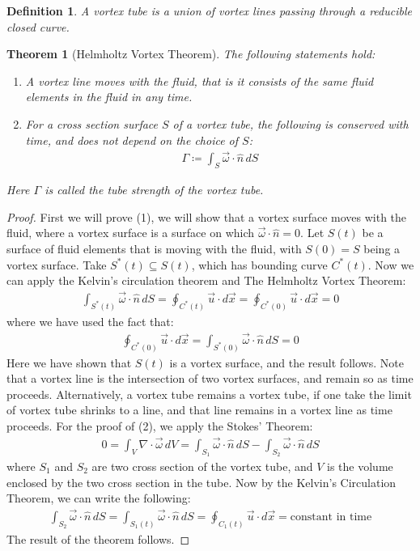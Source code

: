 \documentclass[11pt]{book}
\theoremstyle{break}
\theoremstyle{break}
\newtheorem{thm}{Theorem}[section]
\newtheorem{defn}{Definition}[corL]
\begin{document}
\begin{defn}
A vortex tube is a union of vortex lines passing through a reducible closed curve. 
\end{defn}

\begin{thm}[Helmholtz Vortex Theorem]
The following statements hold:
\begin{enumerate}
\item A vortex line moves with the fluid, that is it consists of the same fluid elements in the fluid in any time.
\item For a cross section surface $S$ of a vortex tube, the following is conserved with time, and does not depend on the choice of $S$:
\begin{align*}
\Gamma \coloneqq \int_{S}\vec{\omega}\cdot \hat{n}\, dS
\end{align*} 
\end{enumerate} 
Here $\Gamma$ is called the tube strength of the vortex tube.
\end{thm}
\begin{proof}
First we will prove (1), we will show that a vortex surface moves with the fluid, where a vortex surface is a surface on which $\vec{\omega}\cdot \hat{n} = 0$. Let $S(t)$ be a surface of fluid elements that is moving with the fluid, with $S(0)=S$ being a vortex surface. Take $S^*(t) \subseteq S(t)$, which has bounding curve $C^*(t)$. Now we can apply the Kelvin's circulation theorem and The Helmholtz Vortex Theorem:
\begin{align*}
\int_{S^*(t)}\vec{\omega}\cdot \hat{n}\, dS  = \oint_{C^*(t)} \vec{u}\cdot d\vec{x} = \oint_{C^*(0)}\vec{u}\cdot d\vec{x} = 0
\end{align*}
where we have used the fact that:
\begin{align*}
\oint_{C^*(0)}\vec{u}\cdot d\vec{x} = \int_{S^*(0)}\vec{\omega}\cdot \hat{n}\, dS = 0 
\end{align*}
Here we have shown that $S(t)$ is a vortex surface, and the result follows. Note that a vortex line is the intersection of two vortex surfaces, and remain so as time proceeds. Alternatively, a vortex tube remains a vortex tube, if one take the limit of vortex tube shrinks to a line, and that line remains in a vortex line as time proceeds. For the proof of (2), we apply the Stokes' Theorem:
\begin{align*}
0 = \int_V \nabla \cdot \vec{\omega} \, dV = \int_{S_1} \vec{\omega }\cdot\hat{n} \, dS - \int_{S_2} \vec{\omega}\cdot \hat{n}\, dS
\end{align*} 
where $S_1$ and $S_2$ are two cross section of the vortex tube, and $V$ is the volume enclosed by the two cross section in the tube. Now by the Kelvin's Circulation Theorem, we can write the following:
\begin{align*}
\int_{S_2} \vec{\omega}\cdot \hat{n}\, dS = \int_{S_1(t)}\vec{\omega}\cdot \hat{n}\, dS = \oint_{C_1(t)}\vec{u}\cdot d\vec{x} = \text{constant in time}
\end{align*}
The result of the theorem follows. 
\end{proof}
\end{document}
